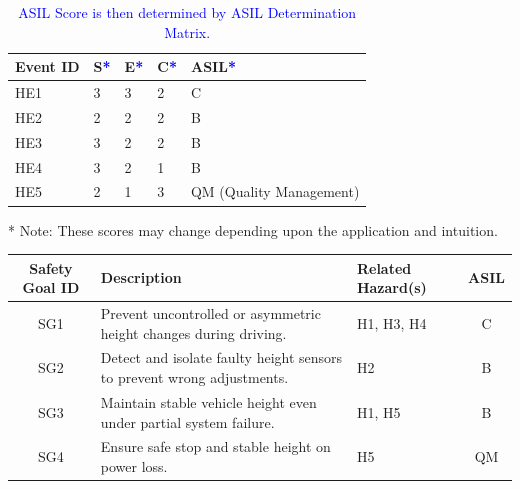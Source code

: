 \begin{solutionblock}
    \begin{table}[ht]
        \centering
        \begin{tabular}{ | m{4em} | m{3em} | m{3em} | m{3em} | m{5cm} | }
            \hline
            Event ID & S\textcolor{blue}{*} & E\textcolor{blue}{*} & C\textcolor{blue}{*} & ASIL\textcolor{blue}{*} \\
            \hline \hline
            HE1 & 3 & 3 & 2 & C \\
            HE2 & 2 & 2 & 2 & B \\
            HE3 & 3 & 2 & 2 & B \\
            HE4 & 3 & 2 & 1 & B \\
            HE5 & 2 & 1 & 3 & QM (Quality Management) \\
            \hline
        \end{tabular}
        \caption{\textcolor{blue}{ASIL Score is then determined by ASIL Determination Matrix.}}
    \end{table}
    * Note: These scores may change depending upon the application and intuition.
\end{solutionblock}


\begin{solutionblock}
    \begin{table}[ht]
        \centering
        \begin{tabular}{|c|p{6cm}|p{4cm}|c|}
            \hline
            Safety Goal ID & Description & Related Hazard(s) & ASIL \\
            \hline
            SG1 & Prevent uncontrolled or asymmetric height changes during driving. & H1, H3, H4 & C \\
            \hline
            SG2 & Detect and isolate faulty height sensors to prevent wrong adjustments. & H2 & B \\
            \hline
            SG3 & Maintain stable vehicle height even under partial system failure. & H1, H5 & B \\
            \hline
            SG4 & Ensure safe stop and stable height on power loss. & H5 & QM \\
            \hline
        \end{tabular}
    \end{table}
\end{solutionblock}




